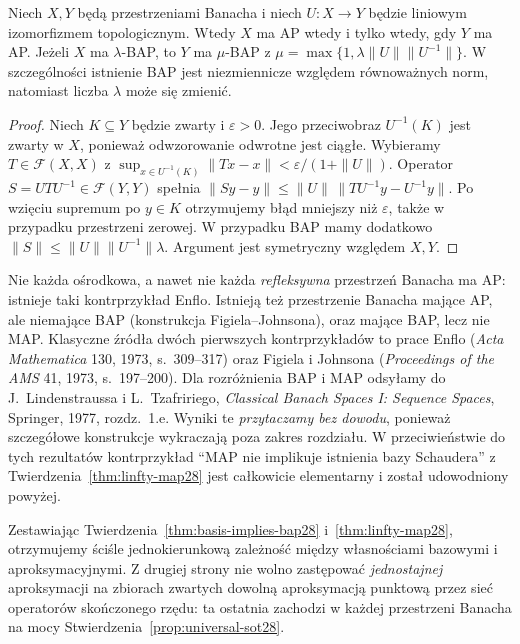 \begin{twierdzenie}
\label{thm:isomorphic28}
Niech $X,Y$ będą przestrzeniami Banacha i niech
$U:X\to Y$ będzie liniowym izomorfizmem topologicznym.
Wtedy $X$ ma AP wtedy i tylko wtedy, gdy $Y$ ma AP.
Jeżeli $X$ ma $\lambda$-BAP, to $Y$ ma
$\mu$-BAP z $\mu=\max\{1,\lambda\|U\|\|U^{-1}\|\}$.
W szczególności istnienie BAP jest niezmiennicze
względem równoważnych norm, natomiast liczba $\lambda$
może się zmienić.
\end{twierdzenie}
\begin{proof}
Niech $K\subseteq Y$ będzie zwarty i $\varepsilon>0$.
Jego przeciwobraz $U^{-1}(K)$ jest zwarty w $X$, ponieważ
odwzorowanie odwrotne jest ciągłe. Wybieramy
$T\in\mathcal F(X,X)$ z
$\sup_{x\in U^{-1}(K)}\|Tx-x\|<\varepsilon/(1+\|U\|)$. Operator $S=UTU^{-1}\in\mathcal F(Y,Y)$
spełnia $\|Sy-y\|\le\|U\|\,\|TU^{-1}y-U^{-1}y\|$.
Po wzięciu supremum po $y\in K$ otrzymujemy błąd
mniejszy niż $\varepsilon$, także w przypadku przestrzeni zerowej.
W przypadku BAP mamy dodatkowo
$\|S\|\le\|U\|\|U^{-1}\|\lambda$.
Argument jest symetryczny względem $X,Y$.
\end{proof}

\begin{uwaga}
\label{rem:enflo-figiel28}
Nie każda ośrodkowa, a nawet nie każda \emph{refleksywna}
przestrzeń Banacha ma AP: istnieje taki kontrprzykład
Enflo. Istnieją też przestrzenie Banacha mające AP,
ale niemające BAP (konstrukcja Figiela--Johnsona),
oraz mające BAP, lecz nie MAP. Klasyczne źródła
dwóch pierwszych kontrprzykładów to prace Enflo
(\emph{Acta Mathematica} 130, 1973, s.~309--317) oraz
Figiela i Johnsona (\emph{Proceedings of the AMS} 41,
1973, s.~197--200). Dla rozróżnienia BAP i MAP odsyłamy
do J.~Lindenstraussa i L.~Tzafririego,
\emph{Classical Banach Spaces I: Sequence Spaces},
Springer, 1977, rozdz.~1.e.
Wyniki te \emph{przytaczamy bez dowodu}, ponieważ szczegółowe
konstrukcje wykraczają poza zakres rozdziału.
W przeciwieństwie do tych rezultatów kontrprzykład
``MAP nie implikuje istnienia bazy Schaudera'' z
Twierdzenia~\ref{thm:linfty-map28} jest całkowicie
elementarny i został udowodniony powyżej.
\end{uwaga}

\begin{uwaga}
\label{rem:recap28}
Zestawiając Twierdzenia~\ref{thm:basis-implies-bap28}
i~\ref{thm:linfty-map28}, otrzymujemy ściśle
jednokierunkową zależność między własnościami bazowymi
i aproksymacyjnymi. Z drugiej strony nie wolno
zastępować \emph{jednostajnej} aproksymacji na
zbiorach zwartych dowolną aproksymacją punktową przez
sieć operatorów skończonego rzędu: ta ostatnia zachodzi
w każdej przestrzeni Banacha na mocy
Stwierdzenia~\ref{prop:universal-sot28}.
\end{uwaga}
